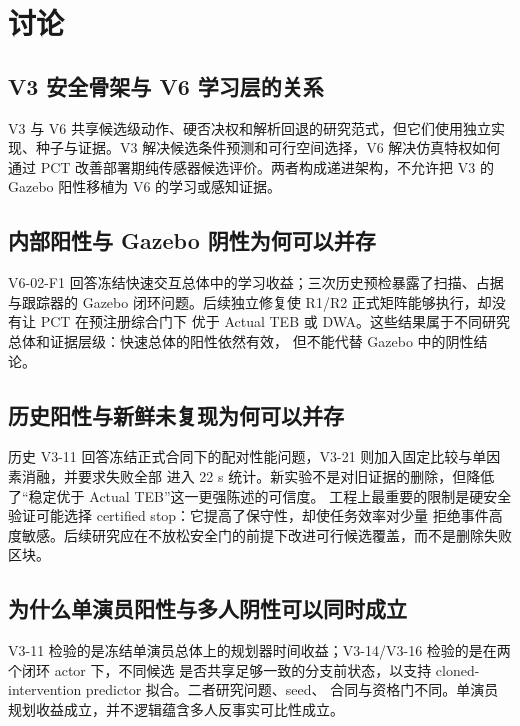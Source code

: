 \documentclass[12pt,a4paper,oneside]{report}
\begin{document}






\chapter{讨论}
\section{V3 安全骨架与 V6 学习层的关系}
V3 与 V6 共享候选级动作、硬否决权和解析回退的研究范式，但它们使用独立实现、种子与证据。V3 解决候选条件预测和可行空间选择，V6 解决仿真特权如何通过 PCT 改善部署期纯传感器候选评价。两者构成递进架构，不允许把 V3 的 Gazebo 阳性移植为 V6 的学习或感知证据。

\section{内部阳性与 Gazebo 阴性为何可以并存}
V6-02-F1 回答冻结快速交互总体中的学习收益；三次历史预检暴露了扫描、占据与跟踪器的
Gazebo 闭环问题。后续独立修复使 R1/R2 正式矩阵能够执行，却没有让 PCT 在预注册综合门下
优于 Actual TEB 或 DWA。这些结果属于不同研究总体和证据层级：快速总体的阳性依然有效，
但不能代替 Gazebo 中的阴性结论。

\section{历史阳性与新鲜未复现为何可以并存}
历史 V3-11 回答冻结正式合同下的配对性能问题，V3-21 则加入固定比较与单因素消融，并要求失败全部
进入 22 s 统计。新实验不是对旧证据的删除，但降低了“稳定优于 Actual TEB”这一更强陈述的可信度。
工程上最重要的限制是硬安全验证可能选择 certified stop：它提高了保守性，却使任务效率对少量
拒绝事件高度敏感。后续研究应在不放松安全门的前提下改进可行候选覆盖，而不是删除失败区块。

\section{为什么单演员阳性与多人阴性可以同时成立}
V3-11 检验的是冻结单演员总体上的规划器时间收益；V3-14/V3-16 检验的是在两个闭环 actor 下，不同候选
是否共享足够一致的分支前状态，以支持 cloned-intervention predictor 拟合。二者研究问题、seed、
合同与资格门不同。单演员规划收益成立，并不逻辑蕴含多人反事实可比性成立。
\end{document}
